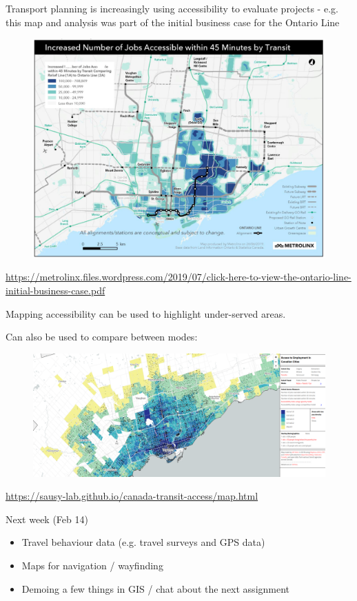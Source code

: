 \documentclass[aspectratio=169]{beamer}
\begin{document}
\begin{frame}
	
	Transport planning is increasingly using accessibility to evaluate projects - e.g. this map and analysis was part of the initial business case for the Ontario Line
	
	\begin{figure}
		\centering
		\includegraphics[width=0.7\linewidth]{images/OL_access_improvements.png}
	\end{figure}
	
	\tiny\url{https://metrolinx.files.wordpress.com/2019/07/click-here-to-view-the-ontario-line-initial-business-case.pdf}
	
\end{frame}




\begin{frame}
	
	Mapping accessibility can be used to highlight under-served areas.
	\vspace{2mm}
	
	Can also be used to compare between modes:
	
	\begin{figure}
		\centering
		\includegraphics[width=1\linewidth]{images/tor_car_transit_access.png}
	\end{figure}

	\tiny\url{https://sausy-lab.github.io/canada-transit-access/map.html}
	
	
\end{frame}




\begin{frame}
	
	Next week (Feb 14)
	
	\begin{itemize}
		\item Travel behaviour data (e.g. travel surveys and GPS data)
		\item Maps for navigation / wayfinding
		\item Demoing a few things in GIS / chat about the next assignment
	\end{itemize}
	
\end{frame}
\end{document}
